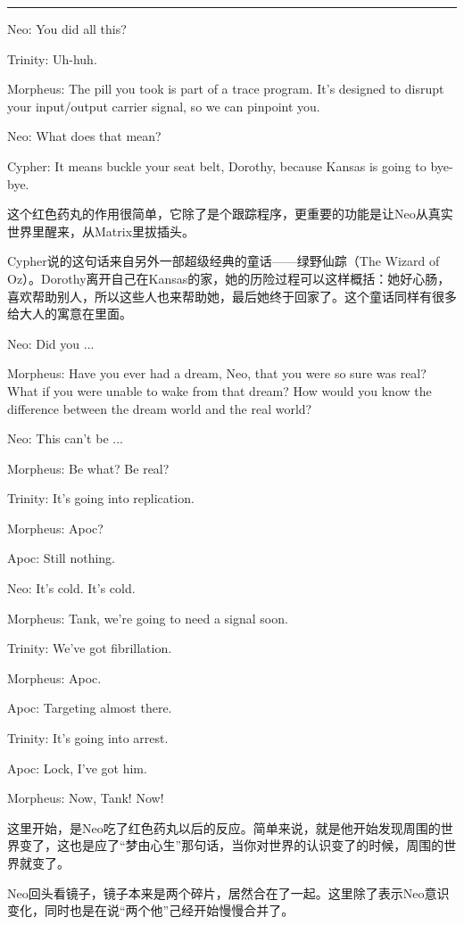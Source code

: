 \documentclass{ctexart}
\newcommand{\myparsep}{\noindent \rule[0.5ex]{\linewidth}{1pt}}
\newenvironment{myquote}{\color{green} \setlength{\leftskip}{6em} \setlength{\rightskip}{4em} \setlength{\parindent}{-2em}}{\par}
\begin{document}
\myparsep

\begin{myquote}
Neo: You did all this?

Trinity: Uh-huh.

Morpheus: The pill you took is part of a trace program. It's designed to disrupt your input/output carrier signal, so we can pinpoint you.

Neo: What does that mean?

Cypher: It means buckle your seat belt, Dorothy, because Kansas is going to bye-bye.
\end{myquote}

这个红色药丸的作用很简单，它除了是个跟踪程序，更重要的功能是让Neo从真实世界里醒来，从Matrix里拔插头。

Cypher说的这句话来自另外一部超级经典的童话——绿野仙踪（The Wizard of Oz）。Dorothy离开自己在Kansas的家，她的历险过程可以这样概括：她好心肠，喜欢帮助别人，所以这些人也来帮助她，最后她终于回家了。这个童话同样有很多给大人的寓意在里面。

\begin{myquote}
Neo: Did you ...

Morpheus: Have you ever had a dream, Neo, that you were so sure was real? What if you were unable to wake from that dream? How would you know the difference between the dream world and the real world?

Neo: This can't be ...

Morpheus: Be what? Be real?

Trinity: It's going into replication.

Morpheus: Apoc?

Apoc: Still nothing.

Neo: It's cold. It's cold.

Morpheus: Tank, we're going to need a signal soon.

Trinity: We've got fibrillation.

Morpheus: Apoc.

Apoc: Targeting almost there.

Trinity: It's going into arrest.

Apoc: Lock, I've got him.

Morpheus: Now, Tank! Now!
\end{myquote}

这里开始，是Neo吃了红色药丸以后的反应。简单来说，就是他开始发现周围的世界变了，这也是应了“梦由心生”那句话，当你对世界的认识变了的时候，周围的世界就变了。

Neo回头看镜子，镜子本来是两个碎片，居然合在了一起。这里除了表示Neo意识变化，同时也是在说“两个他”己经开始慢慢合并了。
\end{document}
